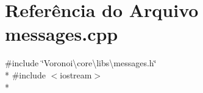 \section{Referência do Arquivo messages.\+cpp}
\label{messages_8cpp}
{\ttfamily \#include \char`\"{}Voronoi\textbackslash{}core\textbackslash{}libs\textbackslash{}messages.\+h\char`\"{}}\\*
{\ttfamily \#include $<$iostream$>$}\\*
